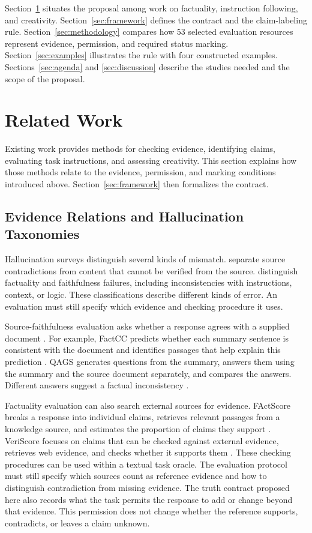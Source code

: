 \documentclass{clv2025}
\begin{document}
Section~\ref{sec:related} situates the proposal among work on factuality,
instruction following, and creativity. Section~\ref{sec:framework} defines
the contract and the claim-labeling rule. Section~\ref{sec:methodology}
compares how 53 selected evaluation resources represent evidence,
permission, and required status marking. Section~\ref{sec:examples} illustrates the rule
with four constructed examples. Sections~\ref{sec:agenda} and
\ref{sec:discussion} describe the studies needed and the scope of the proposal.

\section{Related Work}\label{sec:related}

Existing work provides methods for checking evidence, identifying claims,
evaluating task instructions, and assessing creativity. This section explains
how those methods relate to the evidence, permission, and marking conditions
introduced above. Section~\ref{sec:framework} then formalizes the contract.

\subsection{Evidence Relations and Hallucination Taxonomies}

Hallucination surveys distinguish several kinds of mismatch.
\citet{ji_survey_2023} separate source contradictions from content that cannot
be verified from the source. \citet{huang_survey_2025} distinguish factuality
and faithfulness failures, including inconsistencies with instructions,
context, or logic. These classifications describe different kinds of error.
An evaluation must still specify which evidence and checking procedure it uses.

Source-faithfulness evaluation asks whether a response agrees with a supplied
document \citep{maynez_faithfulness_2020}. For example, FactCC predicts whether
each summary sentence is consistent with the document and identifies
passages that help explain this prediction \citep{kryscinski_evaluating_2020}.
QAGS generates questions from the summary, answers them using the summary
and the source document separately, and compares the answers. Different
answers suggest a factual inconsistency \citep{wang_asking_2020}.

Factuality evaluation can also search external sources for evidence.
FActScore breaks a response into individual claims, retrieves relevant
passages from a knowledge source, and estimates the proportion of claims
they support \citep{min_factscore_2023}. VeriScore focuses on claims that
can be checked against external evidence, retrieves web evidence, and
checks whether it supports them \citep{song_veriscore_2024}.
These checking procedures can be used within a textual task oracle.
The evaluation protocol must still specify which sources count as reference
evidence and how to distinguish contradiction from missing evidence.
The truth contract proposed here also records what the task permits the
response to add or change beyond that evidence. This permission does not
change whether the reference supports, contradicts, or leaves a claim unknown.
\end{document}
